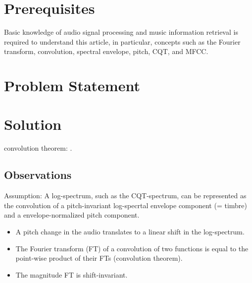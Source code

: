 \documentclass[journal]{IEEEtran}
\begin{document}
\section{Prerequisites}

Basic knowledge of audio signal processing and music information retrieval is required to understand this article, in particular, concepts such as the Fourier transform, convolution, spectral envelope, pitch, CQT, and MFCC.


\section{Problem Statement}

% 


\section{Solution}


convolution theorem: \cite{proakis1995}.

\subsection{Observations}

Assumption: A log-spectrum, such as the CQT-spectrum, can be represented as the convolution of a pitch-invariant log-specrtal envelope component (= timbre) and a envelope-normalized pitch component.

\begin{itemize}
\item A pitch change in the audio translates to a linear shift in the log-spectrum.
\item The Fourier transform (FT) of a convolution of two functions is equal to the point-wise product of their FTs (convolution theorem).
\item The magnitude FT is shift-invariant.
\end{itemize}

\end{document}
